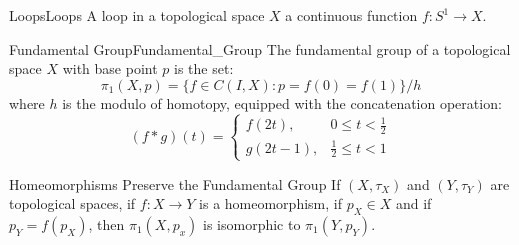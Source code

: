             \begin{ldefinition}{Loops}{Loops}
                A loop in a topological space $X$ a continuous function
                $f:S^{1}\rightarrow{X}$.
            \end{ldefinition}
            \begin{ldefinition}{Fundamental Group}{Fundamental_Group}
                The fundamental group of a topological space
                $X$ with base point $p$ is the set:
                \begin{equation}
                    \pi_{1}(X,p)=
                    \{f\in{C(I,X)}:p=f(0)=f(1)\}/h
                \end{equation}
                where $h$ is the modulo of homotopy,
                equipped with the concatenation operation:
                \begin{equation}
                    (f*g)(t)=
                    \begin{cases}
                        f(2t),&0\leq{t}<\frac{1}{2}\\
                        g(2t-1),&\frac{1}{2}\leq{t}<1
                    \end{cases}
                \end{equation}
            \end{ldefinition}
            \begin{ltheorem}{Homeomorphisms Preserve the Fundamental Group}
                If $(X,\tau_{X})$ and $(Y,\tau_{Y})$ are topological spaces,
                if $f:X\rightarrow{Y}$ is a homeomorphism, if $p_{X}\in{X}$ and
                if $p_{Y}=f(p_{X})$, then $\pi_{1}(X,p_{x})$ is isomorphic
                to $\pi_{1}(Y,p_{Y})$.
            \end{ltheorem}
